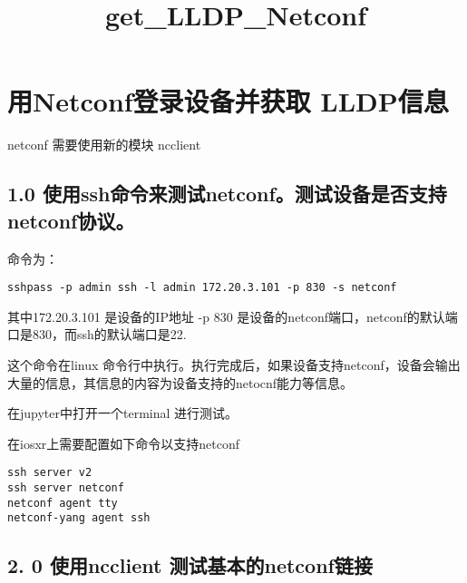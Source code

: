 \documentclass[11pt]{article}
\title{get\_LLDP\_Netconf}
\begin{document}
    
    
    \maketitle
    
    

    
    \hypertarget{ux7528netconfux767bux5f55ux8bbeux5907ux5e76ux83b7ux53d6-lldpux4fe1ux606f}{%
\section{用Netconf登录设备并获取
LLDP信息}\label{ux7528netconfux767bux5f55ux8bbeux5907ux5e76ux83b7ux53d6-lldpux4fe1ux606f}}

netconf 需要使用新的模块 ncclient

    \hypertarget{ux4f7fux7528sshux547dux4ee4ux6765ux6d4bux8bd5netconfux6d4bux8bd5ux8bbeux5907ux662fux5426ux652fux6301netconfux534fux8bae}{%
\subsection{1.0
使用ssh命令来测试netconf。测试设备是否支持netconf协议。}\label{ux4f7fux7528sshux547dux4ee4ux6765ux6d4bux8bd5netconfux6d4bux8bd5ux8bbeux5907ux662fux5426ux652fux6301netconfux534fux8bae}}

命令为：

\begin{verbatim}
sshpass -p admin ssh -l admin 172.20.3.101 -p 830 -s netconf
\end{verbatim}

其中172.20.3.101 是设备的IP地址 -p 830
是设备的netconf端口，netconf的默认端口是830，而ssh的默认端口是22.

这个命令在linux
命令行中执行。执行完成后，如果设备支持netconf，设备会输出大量的信息，其信息的内容为设备支持的netocnf能力等信息。

在jupyter中打开一个terminal 进行测试。

在iosxr上需要配置如下命令以支持netconf

\begin{verbatim}
ssh server v2
ssh server netconf
netconf agent tty
netconf-yang agent ssh
\end{verbatim}

    \hypertarget{ux4f7fux7528ncclient-ux6d4bux8bd5ux57faux672cux7684netconfux94feux63a5}{%
\subsection{2. 0 使用ncclient
测试基本的netconf链接}\label{ux4f7fux7528ncclient-ux6d4bux8bd5ux57faux672cux7684netconfux94feux63a5}}
\end{document}
